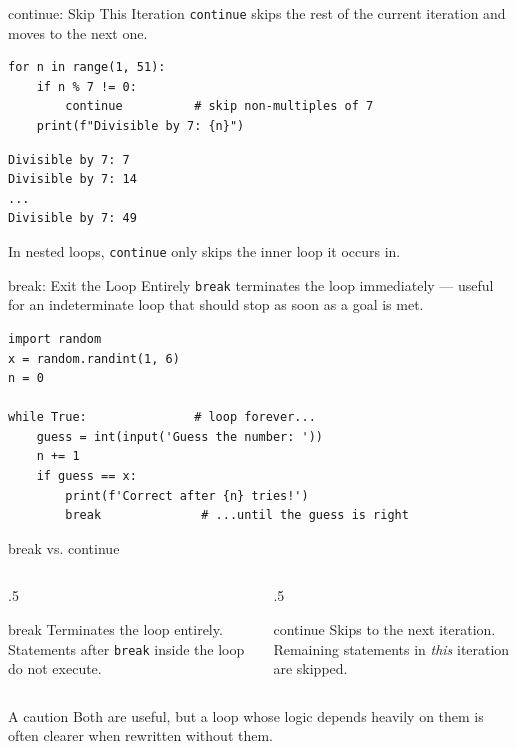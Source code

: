 \documentclass[9pt,aspectratio=169,xcolor=table]{beamer}
\begin{document}
\begin{frame}[fragile]{continue: Skip This Iteration}
    \leavevmode
    \texttt{continue} skips the rest of the current iteration and moves
    to the next one.

\begin{lstlisting}
for n in range(1, 51):
    if n % 7 != 0:
        continue          # skip non-multiples of 7
    print(f"Divisible by 7: {n}")
\end{lstlisting}
\begin{lstlisting}[style=skoutput]
Divisible by 7: 7
Divisible by 7: 14
...
Divisible by 7: 49
\end{lstlisting}

    \vspace{1mm}
    {\small In nested loops, \texttt{continue} only skips the
    \alert{inner} loop it occurs in.}
\end{frame}

\begin{frame}[fragile]{break: Exit the Loop Entirely}
    \leavevmode
    \texttt{break} terminates the loop immediately --- useful for an
    \alert{indeterminate} loop that should stop as soon as a goal is met.

\begin{lstlisting}
import random
x = random.randint(1, 6)
n = 0

while True:               # loop forever...
    guess = int(input('Guess the number: '))
    n += 1
    if guess == x:
        print(f'Correct after {n} tries!')
        break              # ...until the guess is right
\end{lstlisting}
\end{frame}

\begin{frame}{break vs. continue}
    \leavevmode
    \begin{columns}[t]
        \begin{column}{.5\textwidth}
            \begin{block}{break}
                \small Terminates the loop entirely. Statements after
                \texttt{break} inside the loop do not execute.
            \end{block}
        \end{column}
        \begin{column}{.5\textwidth}
            \begin{block}{continue}
                \small Skips to the next iteration. Remaining statements
                in \emph{this} iteration are skipped.
            \end{block}
        \end{column}
    \end{columns}

    \vspace{3mm}
    \begin{alertblock}{A caution}
        Both are useful, but a loop whose logic depends heavily on them
        is often clearer when rewritten without them.
    \end{alertblock}
\end{frame}
\end{document}
